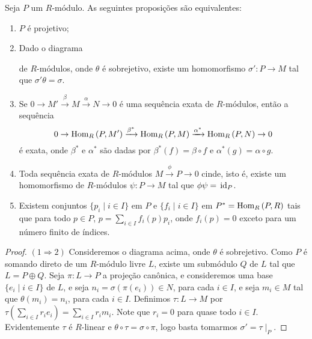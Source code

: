 \begin{teo} \cite[Teorema 2.1.]{paques} \label{teo:mproj} 
Seja $P$ um $R$-módulo. As seguintes proposições são equivalentes:
\begin{enumerate}
    \item $P$ é projetivo;
    \item Dado o diagrama
    \begin{center}
    \end{center}
de $R$-módulos, onde $\theta$ é sobrejetivo, existe um homomorfismo $\sigma':P\rightarrow M$ tal que $\sigma'\theta=\sigma$.
    \item Se $0\rightarrow M' \xrightarrow{\beta} M \xrightarrow{\alpha} N \rightarrow 0$ é uma sequência exata de $R$-módulos, então a sequência \[0\rightarrow \textrm{Hom}_{R}\left( P,M' \right) \xrightarrow{\beta^*} \textrm{Hom}_{R}\left( P,M \right) \xrightarrow{\alpha^*} \textrm{Hom}_{R}\left( P,N \right) \rightarrow 0\] é exata, onde $\beta^*$ e $\alpha^*$ são dadas por $\beta^*(f) = \beta\circ f$ e $\alpha^*(g) = \alpha \circ g$.
    \item Toda sequência exata de $R$-módulos $M\xrightarrow{\phi} P \rightarrow 0$ cinde, isto é, existe um homomorfismo de $R$-módulos $\psi:P \rightarrow M$ tal que $\phi\psi = \, \textrm{id}_{P}$.
    \item Existem conjuntos $\{p_i \mid i \in I\}$ em $P$ e $\{f_i \mid i \in I\}$ em $P^* = \textrm{Hom}_{R}\left( P,R \right)$ tais que para todo $p\in P$, $p = \sum_{i \in I}f_i(p)p_i$, onde $f_i(p) =0$ exceto para um número finito de índices.
\end{enumerate}
\begin{proof}
$(1 \Rightarrow 2)$ Consideremos o diagrama acima, onde $\theta$ é sobrejetivo. Como $P$ é somando direto de um $R$-módulo livre $L$, existe um submódulo $Q$ de $L$ tal que $L=P\oplus Q$. Seja $\pi: L \rightarrow P$ a projeção canônica, e consideremos uma base $\{e_i \mid i \in I\}$ de $L$, e seja $n_i = \sigma(\pi(e_i)) \in N$, para cada $i\in I$, e seja $m_i \in M$ tal que $\theta(m_i) = n_i$, para cada $i \in I$. Definimos $\tau: L \rightarrow M$ por $\tau\left(\sum_{i\in I}r_ie_i \right)=\sum_{i\in I}r_i m_i$. Note que $r_i=0$ para quase todo $i \in I$. Evidentemente $\tau$ é $R$-linear e $\theta\circ \tau=\sigma \circ \pi$, logo basta tomarmos $\sigma ' = \tau \mid_P$. 


\end{proof}
\end{teo}
